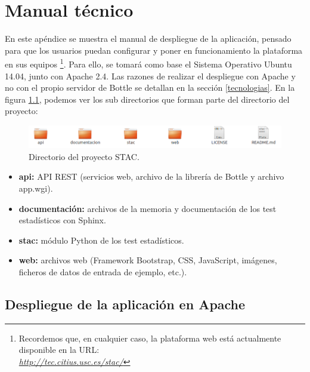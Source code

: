\chapter{Manual técnico}
En este apéndice se muestra el manual de despliegue de la aplicación, pensado para que los usuarios puedan configurar y poner en funcionamiento la plataforma en sus equipos \footnote{Recordemos que, en cualquier caso, la plataforma web está actualmente disponible en la URL: \\ \textit{\url{http://tec.citius.usc.es/stac/}}}. Para ello, se tomará como base el Sistema Operativo Ubuntu 14.04, junto con Apache 2.4. Las razones de realizar el despliegue con Apache y no con el propio servidor de Bottle se detallan en la sección \ref{tecnologias}. En la figura \ref{fig:directorio_proy}, podemos ver los sub directorios que forman parte del directorio del proyecto:

\begin{figure}[H]
\centering
\includegraphics[scale=0.5]{figuras/directorio_proy.png}
\caption{Directorio del proyecto STAC.}
\label{fig:directorio_proy}
\end{figure}

\begin{itemize}
\item \textbf{api:} API REST (servicios web, archivo de la librería de Bottle y archivo app.wgi).
\item \textbf{documentación:} archivos de la memoria y documentación de los test estadísticos con Sphinx.
\item \textbf{stac:} módulo Python de los test estadísticos.
\item \textbf{web:} archivos web (Framework Bootstrap, CSS, JavaScript, imágenes, ficheros de datos de entrada de ejemplo, etc.).
\end{itemize}

\section{Despliegue de la aplicación en Apache}

